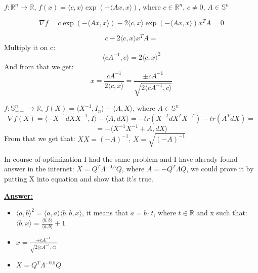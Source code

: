 $f: \mathbb{R}^n \xrightarrow{} \mathbb{R}$, $f(x) = \langle c, x \rangle \exp(-\langle Ax, x \rangle)$, where $c \in \mathbb{R}^n$, $c \not= 0$, $A \in \mathbb{S}^n$

\begin{equation*}
    \nabla f = c \exp(-\langle Ax, x\rangle) - 2\langle c, x \rangle \exp(-\langle Ax, x\rangle) x^TA = 0
\end{equation*}

\begin{equation*}
    c - 2\langle c, x \rangle x^TA = 
\end{equation*}
Multiply it on c:
\begin{equation*}
    \langle cA^{-1}, c \rangle = 2\langle c, x \rangle^2 
\end{equation*}
And from that we get:
\begin{equation*}
    x = \frac{cA^{-1}}{2\langle c, x\rangle} = \frac{\pm cA^{-1}}{\sqrt{2\langle cA^{-1}, c \rangle} }
\end{equation*}


$f: \mathbb{S}_{++}^n \xrightarrow{} \mathbb{R}$, $f(X) = \langle X^{-1}, I_n \rangle -\langle A, X \rangle$, where $A \in \mathbb{S}^n$
\begin{equation*}
        \nabla f(X) = \langle -X^{-1}dXX^{-1}, I \rangle - \langle A, dX \rangle = -tr(X^{-T}dX^{T}X^{-T}) - tr(A^TdX) = 
\end{equation*}
\begin{equation*}
    = -\langle X^{-1}X^{-1} + A, dX \rangle
\end{equation*}
From that we get that: $XX = (-A)^{-1}$, $X = \sqrt{(-A)^{-1}}$

In course of optimization I had the same problem and I have already found answer in the internet: $X = Q^T \Lambda^{-0.5} Q$, where $A = -Q^T \Lambda Q$, we could prove it by putting X into equation and show that it's true.


\underline{\textbf{Answer:}} 
\begin{itemize}
    \item $\langle a, b \rangle^2 = \langle a , a\rangle \langle b, b, x $$ \rangle$, it means that $a = b\cdot t$, where $t \in \mathbb{R}$ and x such that: $\langle b, x \rangle = \frac{\langle b, b \rangle}{\langle a, b \rangle} + 1$
    \item $x  = \frac{\pm cA^{-1}}{\sqrt{2\langle cA^{-1}, c \rangle} }$
    \item $X = Q^T \Lambda^{-0.5} Q$
\end{itemize}

